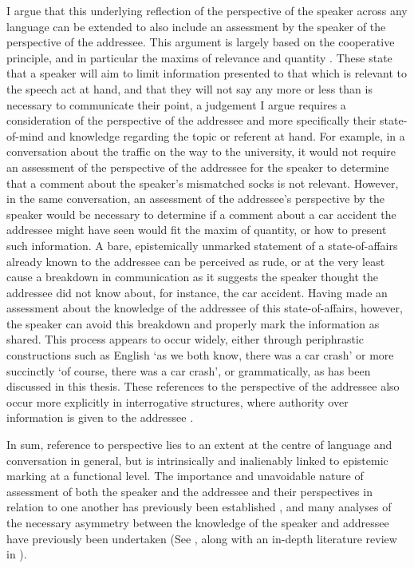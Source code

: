 I argue that this underlying reflection of the perspective of the speaker across any language can be extended to also include an assessment by the speaker of the perspective of the addressee. This argument is largely based on the cooperative principle, and in particular the maxims of relevance and quantity \cite{Grice1989}. These state that a speaker will aim to limit information presented to that which is relevant to the speech act at hand, and that they will not say any more or less than is necessary to communicate their point, a judgement I argue requires a consideration of the perspective of the addressee and more specifically their state-of-mind and knowledge regarding the topic or referent at hand. For example, in a conversation about the traffic on the way to the university, it would not require an assessment of the perspective of the addressee for the speaker to determine that a comment about the speaker's mismatched socks is not relevant. However, in the same conversation, an assessment of the addressee's perspective by the speaker would be necessary to determine if a comment about a car accident the addressee might have seen would fit the maxim of quantity, or how to present such information. A bare, epistemically unmarked statement of a state-of-affairs already known to the addressee can be perceived as rude, or at the very least cause a breakdown in communication as it suggests the speaker thought the addressee did not know about, for instance, the car accident. Having made an assessment about the knowledge of the addressee of this state-of-affairs, however, the speaker can avoid this breakdown and properly mark the information as shared. This process appears to occur widely, either through periphrastic constructions such as English `as we both know, there was a car crash' or more succinctly `of course, there was a car crash', or grammatically, as has been discussed in this thesis. These references to the perspective of the addressee also occur more explicitly in interrogative structures, where authority over information is given to the addressee \cite{Hill2020}.

In sum, reference to perspective lies to an extent at the centre of language and conversation in general, but is intrinsically and inalienably linked to epistemic marking at a functional level. The importance and unavoidable nature of assessment of both the speaker and the addressee and their perspectives in relation to one another has previously been established \cite{Heritage2012}, and many analyses of the necessary asymmetry between the knowledge of the speaker and addressee have previously been undertaken (See , along with an in-depth literature review in ).

